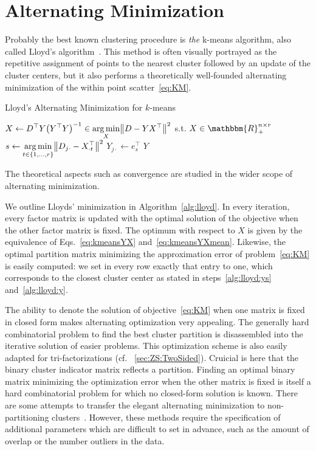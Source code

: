 \section{Alternating Minimization}\label{sec:ZS:Lloyds}
Probably the best known clustering procedure is \emph{the} k-means algorithm, also called Lloyd's algorithm~\citep{lloyd1982least}. This method is often visually portrayed as the repetitive assignment of points to the nearest cluster followed by an update of the cluster centers, but it also performs a theoretically well-founded alternating minimization of the within point scatter~\eqref{eq:KM}.
\begin{algorithm}[t]
\caption{Lloyd's Alternating Minimization for $k$-means} 
\begin{algorithmic}[1]
    \State $\displaystyle X \gets D^\top Y\bigl(Y^\top Y\bigr)^{-1} \in  \operatorname*{arg\,min}_{X}\bigl\lVert D-YX^\top\bigr\rVert ^2$ s.t. $X\in\mathbbm{R}_+^{n\times r}$
        \State $\displaystyle s\gets \operatorname*{arg\,min}_{t\in\{1,\ldots, r\}}\bigl\lVert D_{j\cdot}-X_{\cdot t}^\top\bigr\rVert ^2$ \label{alg:lloyd:ys}
        \State $Y_{j\cdot}\gets e_s^\top$ \label{alg:lloyd:y}
    \EndFor
\EndFor
  \State \Return $Y$
  \EndFunction
\end{algorithmic}
\label{alg:lloyd}
\end{algorithm}
The theoretical aspects such as convergence are studied in the wider scope of alternating minimization. 

We outline Lloyds' minimization in Algorithm~\ref{alg:lloyd}. In every iteration, every factor matrix is updated with the optimal solution of the objective when the other factor matrix is fixed. The optimum with respect to $X$ is given by the equivalence of Eqs.~\eqref{eq:kmeansYX} and~\eqref{eq:kmeansYXmean}. Likewise, the optimal partition matrix minimizing the approximation error of problem~\eqref{eq:KM} is easily computed: we set in every row exactly that entry to one, which corresponds to the closest cluster center as stated in steps~\ref{alg:lloyd:ys} and~\ref{alg:lloyd:y}.

The ability to denote the solution of objective~\eqref{eq:KM} when one matrix is fixed in closed form makes alternating optimization very appealing. The generally hard combinatorial problem to find the best cluster partition is disassembled into the iterative solution of easier problems. This optimization scheme is also easily adapted for tri-factorizations (cf. \@Section~\ref{sec:ZS:TwoSided}). Cruicial is here that the binary cluster indicator matrix reflects a partition. Finding an optimal binary matrix minimizing the optimization error when the other matrix is fixed is itself a hard combinatorial problem for which no closed-form solution is known.
There are some attempts to transfer the elegant alternating minimization to non-partitioning clusters~\citep{chawla2013kmeans,whang2018non}. However, these methods require the specification of additional parameters which are difficult to set in advance, such as the amount of overlap or the number outliers in the data.

